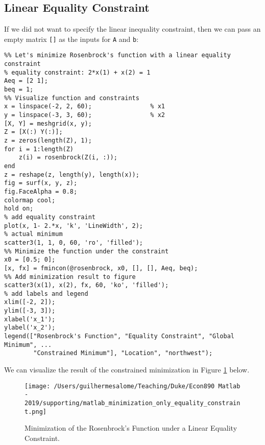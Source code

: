 \documentclass[12pt, a4paper]{article}
\begin{document}
\subsection{Linear Equality Constraint}
\label{sec:org3f62cad}
If we did not want to specify the linear inequality constraint, then we can pass an empty matrix \texttt{[]} as the inputs for \texttt{A} and \texttt{b}:
\lstset{language=matlab,label= ,caption= ,captionpos=b,firstnumber=1,numbers=left,style=Matlab-editor}
\begin{lstlisting}
%% Let's minimize Rosenbrock's function with a linear equality constraint
% equality constraint: 2*x(1) + x(2) = 1
Aeq = [2 1];
beq = 1;
%% Visualize function and constraints
x = linspace(-2, 2, 60);                % x1
y = linspace(-3, 3, 60);                % x2
[X, Y] = meshgrid(x, y);
Z = [X(:) Y(:)];
z = zeros(length(Z), 1);
for i = 1:length(Z)
    z(i) = rosenbrock(Z(i, :));
end
z = reshape(z, length(y), length(x));
fig = surf(x, y, z);
fig.FaceAlpha = 0.8;
colormap cool;
hold on;
% add equality constraint
plot(x, 1- 2.*x, 'k', 'LineWidth', 2);
% actual minimum
scatter3(1, 1, 0, 60, 'ro', 'filled');
%% Minimize the function under the constraint
x0 = [0.5; 0];
[x, fx] = fmincon(@rosenbrock, x0, [], [], Aeq, beq);
%% Add minimization result to figure
scatter3(x(1), x(2), fx, 60, 'ko', 'filled');
% add labels and legend
xlim([-2, 2]);
ylim([-3, 3]);
xlabel('x_1');
ylabel('x_2');
legend(["Rosenbrock's Function", "Equality Constraint", "Global Minimum", ...
        "Constrained Minimum"], "Location", "northwest");
\end{lstlisting}

We can visualize the result of the constrained minimization in Figure \ref{fig:orgf116d16} below.
\begin{figure}[H]
\centering
\texttt{[image: /Users/guilhermesalome/Teaching/Duke/Econ890 Matlab - 2019/supporting/matlab\_minimization\_only\_equality\_constraint.png]}
\caption{\label{fig:orgf116d16}
Minimization of the Rosenbrock's Function under a Linear Equality Constraint.}
\end{figure}
\end{document}
